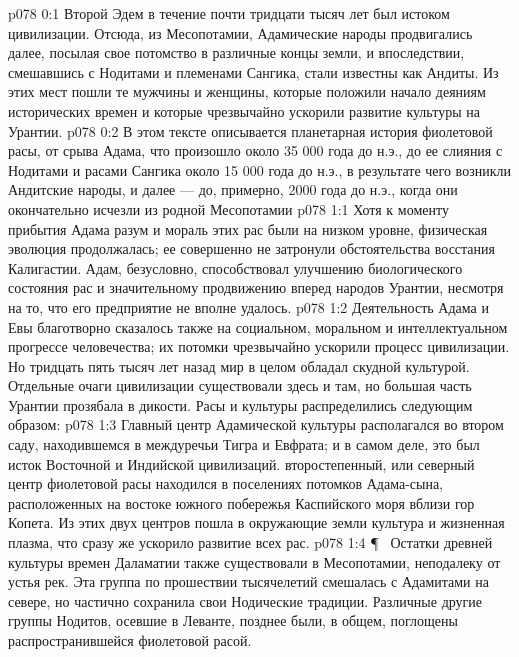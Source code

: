 \author{Архангел}
\vs p078 0:1 Второй Эдем в течение почти тридцати тысяч лет был истоком цивилизации. Отсюда, из Месопотамии, Адамические народы продвигались далее, посылая свое потомство в различные концы земли, и впоследствии, смешавшись с Нодитами и племенами Сангика, стали известны как Андиты. Из этих мест пошли те мужчины и женщины, которые положили начало деяниям исторических времен и которые чрезвычайно ускорили развитие культуры на Урантии.
\vs p078 0:2 В этом тексте описывается планетарная история фиолетовой расы, от срыва Адама, что произошло около 35 000 года до н.э., до ее слияния с Нодитами и расами Сангика около 15 000 года до н.э., в результате чего возникли Андитские народы, и далее --- до, примерно, 2000 года до н.э., когда они окончательно исчезли из родной Месопотамии
\vs p078 1:1 Хотя к моменту прибытия Адама разум и мораль этих рас были на низком уровне, физическая эволюция продолжалась; ее совершенно не затронули обстоятельства восстания Калигастии. Адам, безусловно, способствовал улучшению биологического состояния рас и значительному продвижению вперед народов Урантии, несмотря на то, что его предприятие не вполне удалось.
\vs p078 1:2 Деятельность Адама и Евы благотворно сказалось также на социальном, моральном и интеллектуальном прогрессе человечества; их потомки чрезвычайно ускорили процесс цивилизации. Но тридцать пять тысяч лет назад мир в целом обладал скудной культурой. Отдельные очаги цивилизации существовали здесь и там, но большая часть Урантии прозябала в дикости. Расы и культуры распределились следующим образом:
\vs p078 1:3 \bibnobreakspace {} Главный центр Адамической культуры располагался во втором саду, находившемся в междуречьи Тигра и Евфрата; и в самом деле, это был исток Восточной и Индийской цивилизаций. второстепенный, или северный центр фиолетовой расы находился в поселениях потомков Адама\hyp{}сына, расположенных на востоке южного побережья Каспийского моря вблизи гор Копета. Из этих двух центров пошла в окружающие земли культура и жизненная плазма, что сразу же ускорило развитие всех рас.
\vs p078 1:4 \P\ \bibnobreakspace {} Остатки древней культуры времен Даламатии также существовали в Месопотамии, неподалеку от устья рек. Эта группа по прошествии тысячелетий смешалась с Адамитами на севере, но частично сохранила свои Нодические традиции. Различные другие группы Нодитов, осевшие в Леванте, позднее были, в общем, поглощены распространившейся фиолетовой расой.
